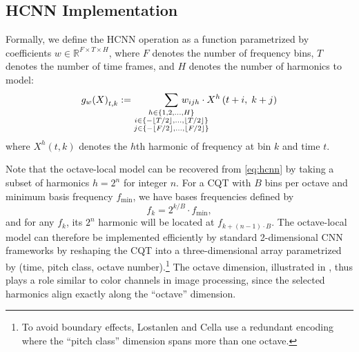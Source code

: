 \documentclass{article}
\begin{document}
\subsection{HCNN Implementation}

Formally, we define the HCNN operation as a function parametrized by coefficients $w \in \mathbb{R}^{F \times T \times H}$, where $F$ denotes the number of frequency bins, $T$ denotes the number of time frames, and $H$ denotes the number of harmonics to model:
\begin{equation}
    {g_w(X)}_{t, k} := 
    \sum_{\substack{%
        h \in \{1, 2, \ldots, H\}\\
        i \in \{-\lfloor T/2\rfloor, \ldots, \lfloor T/2 \rfloor\}\\
        j \in \{-\lfloor F/2\rfloor, \ldots, \lfloor F/2 \rfloor\}}
    }
    \hspace{-3em}%
    w_{ijh} \cdot X^h\left(t + i,\; k + j\right)\label{eq:hcnn}
\end{equation}
where $X^h(t, k)$ denotes the $h$th harmonic of frequency at bin $k$ and time $t$.

Note that the octave-local model can be recovered from \cref{eq:hcnn} by taking a subset of harmonics $h=2^n$ for integer $n$.
For a CQT with $B$ bins per octave and minimum basis frequency $f_{\min}$, we have bases frequencies defined by
\begin{equation}
    f_k = 2^{k/B} \cdot f_{\min}, \label{eq:cqtfreqs}
\end{equation}
and for any $f_k$, its $2^n$ harmonic will be located at $f_{k + (n-1)\cdot B}$.
The octave-local model can therefore be implemented efficiently by standard 2-dimensional CNN frameworks by reshaping the CQT into a three-dimensional array parametrized by (time, pitch class, octave number).\footnote{To avoid boundary effects, Lostanlen and Cella use a redundant encoding where the ``pitch class'' dimension spans more than one octave.}
The octave dimension, illustrated in , thus plays a role similar to color channels in image processing, since the selected harmonics align exactly along the ``octave'' dimension.
\end{document}
